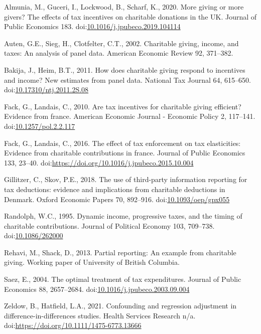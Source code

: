 \documentclass[
  11pt,
  a4paper,
]{article}
\newlength{\cslhangindent}
\newlength{\cslentryspacingunit} %
\newenvironment{CSLReferences}[2] %
 {%
  \setlength{\parindent}{0pt}
  \ifodd #1
  \let\oldpar\par
  \def\par{\hangindent=\cslhangindent\oldpar}
  \fi
  \setlength{\parskip}{#2\cslentryspacingunit}
 }%
 {}
\begin{document}
\hypertarget{refs}{}
\begin{CSLReferences}{1}{0}
\leavevmode{}%
Almunia, M., Guceri, I., Lockwood, B., Scharf, K., 2020. More giving or more givers? The effects of tax incentives on charitable donations in the UK. Journal of Public Economics 183. doi:\href{https://doi.org/10.1016/j.jpubeco.2019.104114}{10.1016/j.jpubeco.2019.104114}

\leavevmode{}%
Auten, G.E., Sieg, H., Clotfelter, C.T., 2002. Charitable giving, income, and taxes: An analysis of panel data. American Economic Review 92, 371--382.

\leavevmode{}%
Bakija, J., Heim, B.T., 2011. How does charitable giving respond to incentives and income? New estimates from panel data. National Tax Journal 64, 615--650. doi:\href{https://doi.org/10.17310/ntj.2011.2S.08}{10.17310/ntj.2011.2S.08}

\leavevmode{}%
Fack, G., Landais, C., 2010. Are tax incentives for charitable giving efficient? Evidence from france. American Economic Journal - Economic Policy 2, 117--141. doi:\href{https://doi.org/10.1257/pol.2.2.117}{10.1257/pol.2.2.117}

\leavevmode{}%
Fack, G., Landais, C., 2016. The effect of tax enforcement on tax elasticities: Evidence from charitable contributions in france. Journal of Public Economics 133, 23--40. doi:\url{https://doi.org/10.1016/j.jpubeco.2015.10.004}

\leavevmode{}%
Gillitzer, C., Skov, P.E., 2018. {The use of third-party information reporting for tax deductions: evidence and implications from charitable deductions in Denmark}. Oxford Economic Papers 70, 892--916. doi:\href{https://doi.org/10.1093/oep/gpx055}{10.1093/oep/gpx055}

\leavevmode{}%
Randolph, W.C., 1995. Dynamic income, progressive taxes, and the timing of charitable contributions. Journal of Political Economy 103, 709--738. doi:\href{https://doi.org/10.1086/262000}{10.1086/262000}

\leavevmode{}%
Rehavi, M., Shack, D., 2013. Partial reporting: An example from charitable giving. Working paper of University of British Columbia.

\leavevmode{}%
Saez, E., 2004. The optimal treatment of tax expenditures. Journal of Public Economics 88, 2657--2684. doi:\href{https://doi.org/10.1016/j.jpubeco.2003.09.004}{10.1016/j.jpubeco.2003.09.004}

\leavevmode{}%
Zeldow, B., Hatfield, L.A., 2021. Confounding and regression adjustment in difference-in-differences studies. Health Services Research n/a. doi:\url{https://doi.org/10.1111/1475-6773.13666}

\end{CSLReferences}
\end{document}
